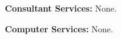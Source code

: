 \documentclass[11pt]{article}
\begin{document}
{\bf Consultant Services:} None.


{\bf Computer Services:} None.
\end{document}
